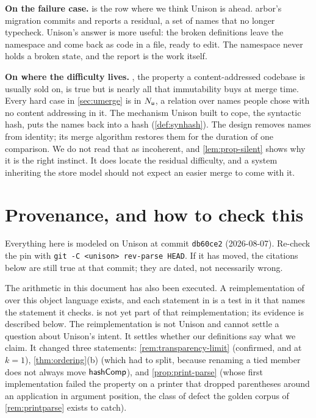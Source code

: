 \documentclass[11pt]{article}
\theoremstyle{definition}
\theoremstyle{plain}
\theoremstyle{remark}
\begin{document}
\textbf{On the failure case.}  is the row where we think Unison is ahead. arbor's
migration commits and reports a residual, a set of names that no longer typecheck. Unison's answer is
more useful: the broken definitions leave the namespace and come back as code in a file, ready to
edit. The namespace never holds a broken state, and the report is the work itself.

\textbf{On where the difficulty lives.} , the property a content-addressed
codebase is usually sold on, is true but is nearly all that immutability buys at merge time. Every
hard case in \cref{sec:umerge} is in $N_{\mathsf{u}}$, a relation over names people chose with no content
addressing in it. The mechanism Unison built to cope, the syntactic hash, puts the names back into a
hash (\cref{def:synhash}). The design removes names from identity; its merge algorithm restores them
for the duration of one comparison. We do not read that as incoherent, and \cref{lem:prop-silent}
shows why it is the right instinct. It does locate the residual difficulty, and a system inheriting
the store model should not expect an easier merge to come with it.

\appendix

\section{Provenance, and how to check this}\label{sec:paths}

Everything here is modeled on Unison at commit \texttt{db60ce2} (2026-08-07). Re-check the pin with
\texttt{git -C <unison> rev-parse HEAD}. If it has moved, the citations below are still true at that
commit; they are dated, not necessarily wrong.

The arithmetic in this document has also been executed. A reimplementation of
 over this object language exists, and each statement in
 is a test in it that names the statement it checks. 
is not yet part of that reimplementation; its evidence is described below. The reimplementation is
not Unison and cannot settle a question about Unison's intent. It settles whether our definitions say
what we claim. It changed three statements: \cref{rem:transparency-limit} (confirmed, and at $k = 1$),
\cref{thm:ordering}(b) (which had to split, because renaming a tied member does not always move
$\mathsf{hashComp}$), and \cref{prop:print-parse} (whose first implementation failed the property on a printer
that dropped parentheses around an application in argument position, the class of defect the golden
corpus of \cref{rem:printparse} exists to catch).
\end{document}
